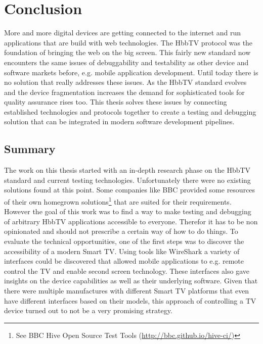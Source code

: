 \chapter{Conclusion\label{cha:chapter7}}

%

More and more digital devices are getting connected to the internet and run applications that are build with web technologies. The HbbTV protocol was the foundation of bringing the web on the big screen. This fairly new standard now encounters the same issues of debuggability and testability as other device and software markets before, e.g. mobile application development. Until today there is no solution that really addresses these issues. As the HbbTV standard evolves and the device fragmentation increases the demand for sophisticated tools for quality assurance rises too. This thesis solves these issues by connecting established technologies and protocols together to create a testing and debugging solution that can be integrated in modern software development pipelines.

\section{Summary\label{sec:summary}}


The work on this thesis started with an in-depth research phase on the HbbTV standard and current testing technologies. Unfortunately there were no existing solutions found at this point. Some companies like BBC provided some resources of their own homegrown solutions\footnote{See BBC Hive Open Source Test Tools (\url{http://bbc.github.io/hive-ci/})} that are suited for their requirements. However the goal of this work was to find a way to make testing and debugging of arbitrary HbbTV applications accessible to everyone. Therefor it has to be non opinionated and should not prescribe a certain way of how to do things. To evaluate the technical opportunities, one of the first steps was to discover the accessibility of a modern Smart TV. Using tools like WireShark a variety of interfaces could be discovered that allowed mobile applications to e.g. remote control the TV and enable second screen technology. These interfaces also gave insights on the device capabilities as well as their underlying software. Given that there were multiple manufactures with different Smart TV platforms that even have different interfaces based on their models, this approach of controlling a TV device turned out to not be a very promising strategy.

